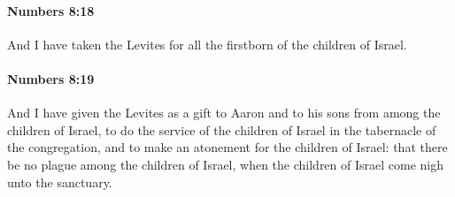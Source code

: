 		\paragraph{Numbers 8:18} %
			\label{NUMBERS-8-18}

			And I have taken the Levites for all the firstborn of the children of Israel.


		\paragraph{Numbers 8:19} %
			\label{NUMBERS-8-19}

			And I have given the Levites as a gift to Aaron and to his sons from among the children of Israel, to do the service of the children of Israel in the tabernacle of the congregation, and to make an atonement for the children of Israel: that there be no plague among the children of Israel, when the children of Israel come nigh unto the sanctuary.

